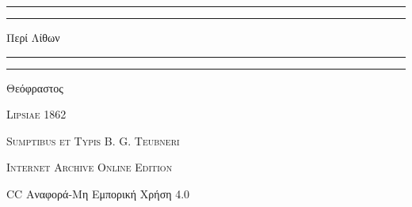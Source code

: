 \documentclass[a4paper, 11pt, oneside, polutonikogreek, german]{article}
\begin{document}
\begin{titlepage} %
	\centering %


	\rule{\textwidth}{1.6pt}\vspace*{-\baselineskip}\vspace*{2pt} %
	\rule{\textwidth}{0.4pt} %
	
	\vspace{1\baselineskip} %
	
	{\Huge Περί Λίθων}
	
	\vspace{1\baselineskip} %

	\rule{\textwidth}{0.4pt}\vspace*{-\baselineskip}\vspace{3.2pt} %
	\rule{\textwidth}{1.6pt} %
	
	\vspace{1\baselineskip} %
	
	
	{\Large Θεόφραστος}
 
        \vspace{0.5\baselineskip}
	
	\vspace*{1\baselineskip} %
	
        {\scshape \normalsize } %

        \vspace*{\fill}    

	\vspace{1\baselineskip}

	{\small\scshape Lipsiae 1862}
	
	{\small\scshape{Sumptibus et Typis B. G. Teubneri}}
	
	\vspace{0.5\baselineskip} %

        {\scshape Internet Archive Online Edition}%
    
	{\small CC Αναφορά-Μη Εμπορική Χρήση 4.0} %
\end{titlepage}
\end{document}
